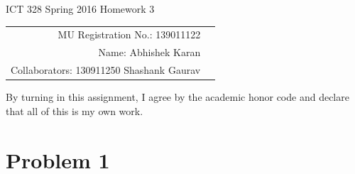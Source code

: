 \documentclass[12pt]{article}
\begin{document}
\begin{center}
{\Large ICT 328 Spring 2016 Homework 3} %

\begin{tabular}{rl}
MU Registration No.: 139011122\\
Name: Abhishek Karan\\
Collaborators: 130911250 Shashank Gaurav\\
\end{tabular}
\end{center}

By turning in this assignment, I agree by the academic honor code and declare that all of this is my own work.

\section*{Problem 1}
\end{document}
